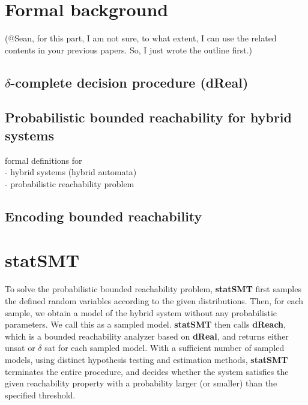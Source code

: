 \documentclass[runningheads,a4paper]{llncs}
\begin{document}
\section{Formal background}
(@Sean, for this part, I am not sure, to what extent, I can use the related contents in your previous papers. So, I just wrote the outline first.)\\

\subsection{$\delta$-complete decision procedure (dReal)}

\subsection{Probabilistic bounded reachability for hybrid systems}
formal definitions for\\
- hybrid systems (hybrid automata)\\
- probabilistic reachability problem

\subsection{Encoding bounded reachability}



\section{statSMT}

To solve the probabilistic bounded reachability problem, {\bf statSMT} first samples the defined random variables according to the given distributions. Then, for each sample, we obtain a model of the hybrid system without any probabilistic parameters. We call this as a sampled model. {\bf statSMT} then calls {\bf dReach}, which is a bounded reachability analyzer based on {\bf dReal}, and returns either unsat or $\delta$ sat for each sampled model. With a sufficient number of sampled models, using distinct hypothesis testing and estimation methods, {\bf statSMT} terminates the entire procedure, and decides whether the system satisfies the given reachability property with a probability larger (or smaller) than the specified threshold.
\end{document}
